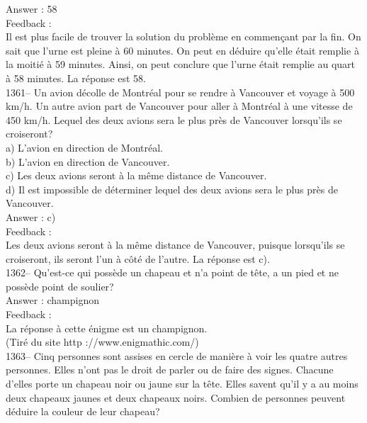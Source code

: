 \documentclass[letterpaper, 12pt]{article}
\begin{document}
Answer : 58\\

Feedback : \\
Il est plus facile de trouver la solution du probl\`eme en commen\c cant par
la fin.  On sait que l'urne est pleine \`a 60 minutes.  On peut en d\'eduire
qu'elle \'etait remplie \`a la moiti\'e \`a 59 minutes.  Ainsi, on peut
conclure que l'urne \'etait remplie au quart \`a 58 minutes.  La r\'eponse
est 58.\\

1361-- Un avion d\'ecolle de Montr\'eal pour se rendre \`a Vancouver et
voyage \`a 500 km/h.  Un autre avion part de Vancouver pour aller \`a
Montr\'eal \`a une vitesse de 450 km/h.  Lequel des deux avions sera le plus
pr\`es de Vancouver lorsqu'ils se croiseront?\\
a) L'avion en direction de Montr\'eal.\\
b) L'avion en direction de Vancouver.\\
c) Les deux avions seront \`a la m\^eme distance de Vancouver.\\
d) Il est impossible de d\'eterminer lequel des deux avions sera le plus
pr\`es de Vancouver.\\

Answer : c)\\

Feedback : \\
Les deux avions seront \`a la m\^eme distance de Vancouver, puisque
lorsqu'ils se croiseront, ils seront l'un \`a c\^ot\'e de l'autre.  La
r\'eponse est c).\\



1362-- Qu'est-ce qui poss\`ede un chapeau et n'a point de t\^ete, a un pied
et ne poss\`ede point de soulier?\\

Answer : champignon\\

Feedback : \\
La r\'eponse \`a cette \'enigme est un champignon.\\
(Tir\'e du site http ://www.enigmathic.com/)\\





1363-- Cinq personnes sont assises en cercle de mani\`ere \`a voir les
quatre autres personnes.  Elles n'ont pas le droit de parler ou de faire des
signes.  Chacune d'elles porte un chapeau noir ou jaune sur la t\^ete.
Elles savent qu'il y a au moins deux chapeaux jaunes et deux chapeaux noirs.
  Combien de personnes peuvent d\'eduire la couleur de leur chapeau?\\
\end{document}
